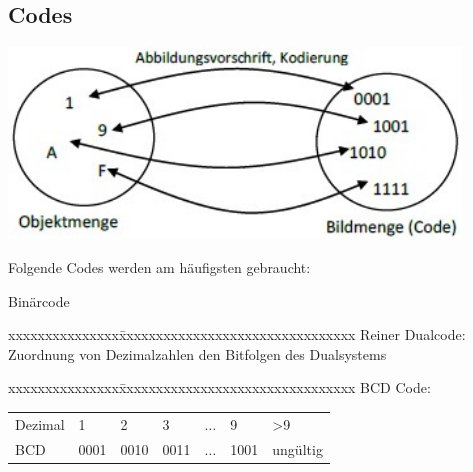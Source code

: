 \subsection{Codes}
	\begin{minipage}[c]{5 cm}
		\includegraphics[width=0.9\textwidth]{pics/codes.jpg}
	\end{minipage}
	\begin{minipage}[c]{13 cm}
		Folgende Codes werden am häufigsten gebraucht:
		\begin{compactitem}
			\item Binärcode
			\item 
				\begin{tabbing}
					xxxxxxxxxxxxxxx\=xxxxxxxxxxxxxxxxxxxxxxxxxxxxxxxx\kill	
					Reiner Dualcode: \> Zuordnung von Dezimalzahlen den Bitfolgen des Dualsystems
				\end{tabbing}
			\item 
				\begin{tabbing}
					xxxxxxxxxxxxxxx\=xxxxxxxxxxxxxxxxxxxxxxxxxxxxxxxx\kill
					BCD Code: \> 
								\begin{tabular}{|lllllll|}
									\hline
										Dezimal & 1 & 2 & 3 & $\dots$ & 9 & \textgreater 9 \\
										BCD & 0001 & 0010 & 0011 & $\dots$ & 1001 & ungültig\\
									\hline
								\end{tabular}
				\end{tabbing}
		\end{compactitem}
	\end{minipage}

